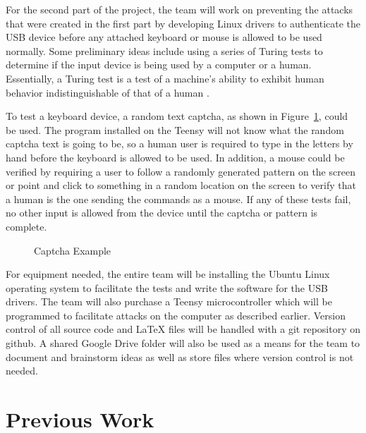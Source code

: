 \documentclass{ieee}
\begin{document}
For the second part of the project, the team will work on preventing the attacks that were created in the first part by developing Linux drivers to authenticate the USB device before any attached keyboard or mouse is allowed to be used normally. Some preliminary ideas include using a series of Turing tests to determine if the input device is being used by a computer or a human. Essentially, a Turing test is a test of a machine's ability to exhibit human behavior indistinguishable of that of a human \cite{wiki}.

To test a keyboard device, a random text captcha, as shown in  Figure~\ref{fig:Captcha}, could be used. The program installed on the Teensy will not know what the random captcha text is going to be, so a human user is required to type in the letters by hand before the keyboard is allowed to be used. In addition, a mouse could be verified by requiring a user to follow a randomly generated pattern on the screen or point and click to something in a random location on the screen to verify that a human is the one sending the commands as a mouse. If any of these tests fail, no other input is allowed from the device until the captcha or pattern is complete.

\begin{figure}[H]
   \caption{Captcha Example}
   \label{fig:Captcha}
\end{figure}

For equipment needed, the entire team will be installing the Ubuntu Linux operating system to facilitate the tests and write the software for the USB drivers. The team will also purchase a Teensy microcontroller which will be programmed to facilitate attacks on the computer as described earlier. Version control of all source code and LaTeX files will be handled with a git repository on github. A shared Google Drive folder will also be used as a means for the team to document and brainstorm ideas as well as store files where version control is not needed.

\section{Previous Work}
\end{document}
